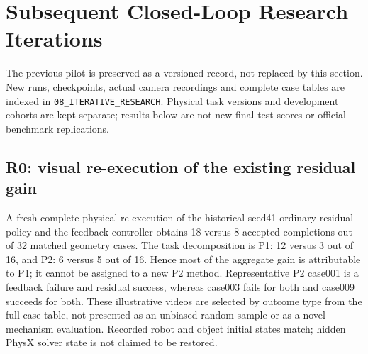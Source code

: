 \section{Subsequent Closed-Loop Research Iterations}
The previous pilot is preserved as a versioned record, not replaced by this section. New runs, checkpoints, actual camera recordings and complete case tables are indexed in \texttt{08\_ITERATIVE\_RESEARCH}. Physical task versions and development cohorts are kept separate; results below are not new final-test scores or official benchmark replications.

\begin{table}[t]\centering\small
\caption{Completed new-round P2 development evaluations generated from the actual run index. Independent success is distinct from raw reward. Seeds refer to independently trained policies, not independent replications of the same test scenes. Each round has a separately versioned physical interface and duration contract, so cross-round differences are not a single-component causal ablation. Camera re-executions, training-geometry checks and incomplete audits are excluded.}\label{tab:iterations}

\end{table}

\subsection{R0: visual re-execution of the existing residual gain}
A fresh complete physical re-execution of the historical seed41 ordinary residual policy and the feedback controller obtains 18 versus 8 accepted completions out of 32 matched geometry cases. The task decomposition is P1: 12 versus 3 out of 16, and P2: 6 versus 5 out of 16. Hence most of the aggregate gain is attributable to P1; it cannot be assigned to a new P2 method. Representative P2 case001 is a feedback failure and residual success, whereas case003 fails for both and case009 succeeds for both. These illustrative videos are selected by outcome type from the full case table, not presented as an unbiased random sample or as a novel-mechanism evaluation. Recorded robot and object initial states match; hidden PhysX solver state is not claimed to be restored.



